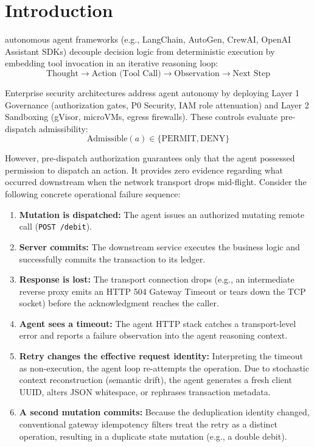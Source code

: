 \documentclass[10pt,journal,compsoc]{IEEEtran}
\begin{document}
\maketitle
\IEEEdisplaynontitleabstractindextext
\IEEEpeerreviewmaketitle

\section{Introduction}
 autonomous agent frameworks (e.g., LangChain, AutoGen, CrewAI, OpenAI Assistant SDKs) decouple decision logic from deterministic execution by embedding tool invocation in an iterative reasoning loop:
\begin{equation}
\text{Thought} \longrightarrow \text{Action (Tool Call)} \longrightarrow \text{Observation} \longrightarrow \text{Next Step}
\end{equation}

Enterprise security architectures address agent autonomy by deploying Layer 1 Governance (authorization gates, P0 Security, IAM role attenuation) and Layer 2 Sandboxing (gVisor, microVMs, egress firewalls). These controls evaluate pre-dispatch admissibility:
\begin{equation}
\text{Admissible}(a) \in \{\text{PERMIT}, \text{DENY}\}
\end{equation}

However, pre-dispatch authorization guarantees only that the agent possessed permission to dispatch an action. It provides zero evidence regarding what occurred downstream when the network transport drops mid-flight. Consider the following concrete operational failure sequence:
\begin{enumerate}
    \item \textbf{Mutation is dispatched:} The agent issues an authorized mutating remote call (\texttt{POST /debit}).
    \item \textbf{Server commits:} The downstream service executes the business logic and successfully commits the transaction to its ledger.
    \item \textbf{Response is lost:} The transport connection drops (e.g., an intermediate reverse proxy emits an HTTP 504 Gateway Timeout or tears down the TCP socket) before the acknowledgment reaches the caller.
    \item \textbf{Agent sees a timeout:} The agent HTTP stack catches a transport-level error and reports a failure observation into the agent reasoning context.
    \item \textbf{Retry changes the effective request identity:} Interpreting the timeout as non-execution, the agent loop re-attempts the operation. Due to stochastic context reconstruction (semantic drift), the agent generates a fresh client UUID, alters JSON whitespace, or rephrases transaction metadata.
    \item \textbf{A second mutation commits:} Because the deduplication identity changed, conventional gateway idempotency filters treat the retry as a distinct operation, resulting in a duplicate state mutation (e.g., a double debit).
\end{enumerate}
\end{document}
